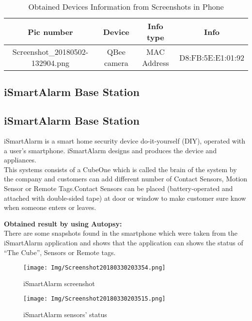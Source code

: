 \documentclass{easychair}
\begin{document}
\begin{enumerate}
\begin{table}[]
\begin{tabular}{|c|c|c|c|}							 
\hline
Pic number	& Device &	Info type &	Info\\
\hline
Screenshot_20180502-132904.png & QBee camera & MAC Address & D8:FB:5E:E1:01:92 \\
\hline
\end{tabular}
 \caption{Obtained Devices Information from Screenshots in Phone}
   \label{tab:my_label}
\end{table}

\subsection{iSmartAlarm Base Station}
\subsection{iSmartAlarm Base Station}

iSmartAlarm is a smart home security device do-it-yourself (DIY), operated with a user's smartphone. iSmartAlarm designs and produces the device and appliances\cite{pari_4}.\\
This systems consists of a CubeOne which is called the brain of the system by the company and customers can add different number of Contact Sensors, Motion Sensor or Remote Tags.Contact Sensors can be placed (battery-operated and attached with double-sided tape) at door or window to make customer sure know when someone enters or leaves\cite{pari_5}.\\   

\textbf{}

\textbf{Obtained result by using Autopsy:}\\
There are some snapshots found in the smartphone which were taken from the iSmartAlarm application and shows that the application can shows the status of “The Cube”, Sensors or Remote tags.

\begin{figure}[H]
    \centering
    \texttt{[image: Img/Screenshot20180330203354.png]}
    \caption{iSmartAlarm screenshot}
    \label{fig:my_label}
\end{figure}

\begin{figure}[H]
    \centering
    \texttt{[image: Img/Screenshot20180330203515.png]}
    \caption{iSmartAlarm sensors' status}
    \label{fig:my_label}
\end{figure}


\end{enumerate}
\end{document}
